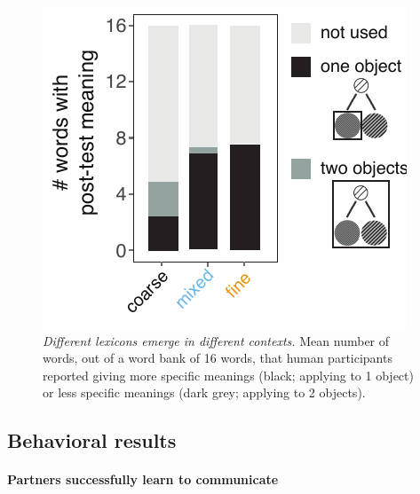 
\begin{figure}[t]
\begin{center}
\includegraphics[scale=1]{./figures/Exp2_postTest}
\caption{\emph{Different lexicons emerge in different contexts.} Mean number of words, out of a word bank of 16 words, that human participants reported giving more specific meanings (black; applying to 1 object) or less specific meanings (dark grey; applying to 2 objects).}
\label{fig:sec2postTest}
\end{center}
\end{figure}


\subsection{Behavioral results}

\paragraph{Partners successfully learn to communicate}


